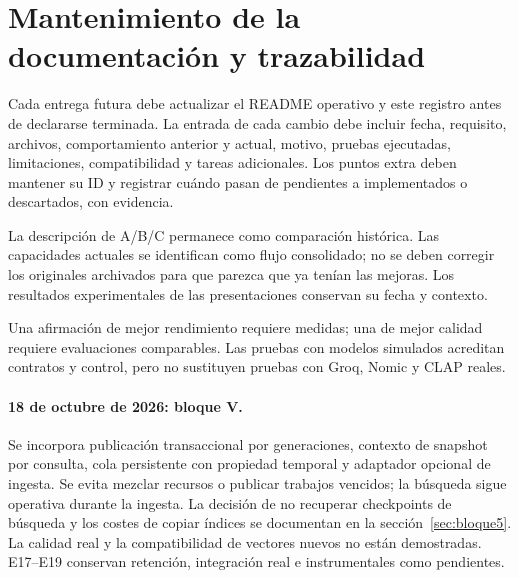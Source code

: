 \section{Mantenimiento de la documentación y trazabilidad}
\label{sec:mantenimiento}
Cada entrega futura debe actualizar el README operativo y este registro antes de
declararse terminada. La entrada de cada cambio debe incluir fecha, requisito,
archivos, comportamiento anterior y actual, motivo, pruebas ejecutadas,
limitaciones, compatibilidad y tareas adicionales. Los puntos extra deben
mantener su ID y registrar cuándo pasan de pendientes a implementados o
descartados, con evidencia.

La descripción de A/B/C permanece como comparación histórica. Las capacidades
actuales se identifican como flujo consolidado; no se deben corregir los
originales archivados para que parezca que ya tenían las mejoras. Los resultados
experimentales de las presentaciones conservan su fecha y contexto.

Una afirmación de mejor rendimiento requiere medidas; una de mejor calidad
requiere evaluaciones comparables. Las pruebas con modelos simulados acreditan
contratos y control, pero no sustituyen pruebas con Groq, Nomic y CLAP reales.
\paragraph{18 de octubre de 2026: bloque V.}
Se incorpora publicación transaccional por generaciones, contexto de snapshot
por consulta, cola persistente con propiedad temporal y adaptador opcional de
ingesta. Se evita mezclar recursos o publicar trabajos vencidos; la búsqueda sigue
operativa durante la ingesta. La decisión de no recuperar checkpoints de búsqueda
y los costes de copiar índices se documentan en la sección~\ref{sec:bloque5}.
La calidad real y la compatibilidad de vectores nuevos no están demostradas.
E17--E19 conservan retención, integración real e instrumentales como pendientes.

